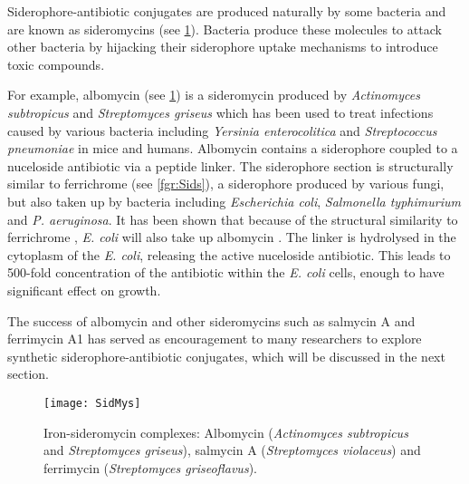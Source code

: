 Siderophore-antibiotic conjugates are produced naturally by some bacteria and are known as sideromycins\cite{Page2013} (see \ref{fgr:SidMys}). Bacteria produce these molecules to attack other bacteria by hijacking their siderophore uptake mechanisms to introduce toxic compounds. 

For example, albomycin  (see \ref{fgr:SidMys}) is a sideromycin produced by \textit{Actinomyces subtropicus} and \textit{Streptomyces griseus}\cite{Hartmann1979,Fiedler1985} which has been used to treat infections caused by various bacteria including \textit{Yersinia enterocolitica} and \textit{Streptococcus pneumoniae} in mice and humans\cite{Gause1955,Pramanik2007}. 
Albomycin  contains a siderophore coupled to a nuceloside antibiotic via a peptide linker. 
The siderophore section is structurally similar to ferrichrome  (see \ref{fgr:Sids}), a siderophore produced by various fungi, but also taken up by bacteria including \textit{Escherichia coli}, \textit{Salmonella typhimurium} and \textit{P. aeruginosa}\cite{vanderHelm1980,Hannauer2010}.
It has been shown that because of the structural similarity to ferrichrome , \textit{E. coli} will also take up albomycin \cite{Hartmann1979}.
The linker is hydrolysed in the cytoplasm of the \textit{E. coli}, releasing the active nuceloside antibiotic. This leads to 500-fold concentration of the antibiotic within the \textit{E. coli} cells, enough to have significant effect on growth.

The success of albomycin\cite{Gause1955} and other sideromycins such as salmycin A\cite{Hider2010,Vertesy1995,Braun2009} and ferrimycin A1\cite{Sackmann1962,Gottlieb2012} has served as encouragement to many researchers to explore synthetic siderophore-antibiotic conjugates, which will be discussed in the next section. 


\begin{figure}[H]
	\begin{center}
		\texttt{[image: SidMys]}
		\caption{Iron-sideromycin complexes: Albomycin \cite{Benz1982,Hider2010} (\textit{Actinomyces subtropicus} and \textit{Streptomyces griseus}), salmycin A\cite{Hider2010,Vertesy1995,Braun2009} (\textit{Streptomyces violaceus}) and ferrimycin\cite{Hider2010} (\textit{Streptomyces griseoflavus}). \label{fgr:SidMys}}
	\end{center}
\end{figure}

